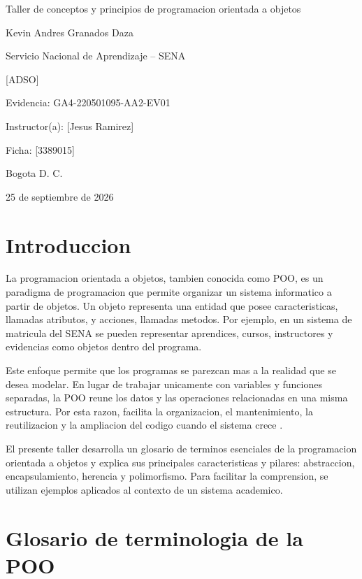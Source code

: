 \documentclass[12pt,letterpaper]{article}
\newcommand{\institucion}{Servicio Nacional de Aprendizaje -- SENA}
\newcommand{\programa}{[ADSO]}
\newcommand{\tituloTrabajo}{Taller de conceptos y principios de programacion orientada a objetos}
\newcommand{\codigoEvidencia}{GA4-220501095-AA2-EV01}
\newcommand{\aprendiz}{Kevin Andres Granados Daza}
\newcommand{\instructor}{[Jesus Ramirez]}
\newcommand{\ficha}{[3389015]}
\newcommand{\ciudad}{Bogota D. C.}
\newcommand{\fechaEntrega}{25 de septiembre de 2026}
\begin{document}
\begin{titlepage}
    \centering
    \vspace*{2.5cm}
    {\Large \tituloTrabajo\par}
    \vfill
    {\large \aprendiz\par}
    \vspace{1.5cm}
    {\large \institucion\par}
    {\large \programa\par}
    \vspace{1cm}
    {\large Evidencia: \codigoEvidencia\par}
    \vspace{1cm}
    {\large Instructor(a): \instructor\par}
    {\large Ficha: \ficha\par}
    \vfill
    {\large \ciudad\par}
    {\large \fechaEntrega\par}
\end{titlepage}

\section{Introduccion}

La programacion orientada a objetos, tambien conocida como POO, es un paradigma de programacion que permite organizar un sistema informatico a partir de objetos. Un objeto representa una entidad que posee caracteristicas, llamadas atributos, y acciones, llamadas metodos. Por ejemplo, en un sistema de matricula del SENA se pueden representar aprendices, cursos, instructores y evidencias como objetos dentro del programa.

Este enfoque permite que los programas se parezcan mas a la realidad que se desea modelar. En lugar de trabajar unicamente con variables y funciones separadas, la POO reune los datos y las operaciones relacionadas en una misma estructura. Por esta razon, facilita la organizacion, el mantenimiento, la reutilizacion y la ampliacion del codigo cuando el sistema crece \parencite{ibmOOP,unamPOO}.

El presente taller desarrolla un glosario de terminos esenciales de la programacion orientada a objetos y explica sus principales caracteristicas y pilares: abstraccion, encapsulamiento, herencia y polimorfismo. Para facilitar la comprension, se utilizan ejemplos aplicados al contexto de un sistema academico.

\section{Glosario de terminologia de la POO}
\end{document}
